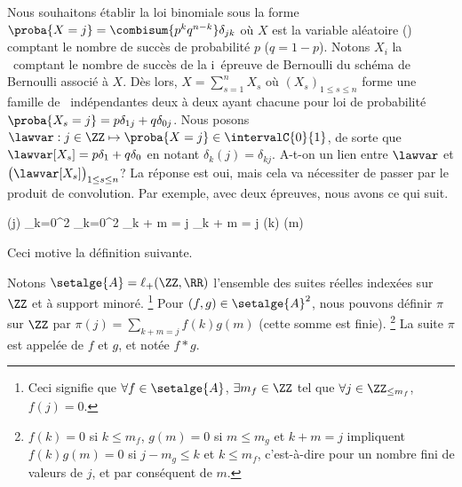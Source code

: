 Nous souhaitons établir la loi binomiale sous la forme
$\proba{X = j} = \combisum{p^k q^{n-k}} \delta_{jk}$
où $X$ est la variable aléatoire (\va) comptant le nombre de succès de probabilité $p$ ($q = 1 - p$).
%
Notons $X_i$ la \va\ comptant le nombre de succès de la i\ieme\ épreuve de Bernoulli du schéma de Bernoulli associé à $X$.
Dès lors,
$X = \sum_{s=1}^{n} X_s$ 
où
$(X_s)_{1 \leq s \leq n}$ forme une famille de \va\ indépendantes deux à deux  ayant chacune pour loi de probabilité $\proba{X_s = j} = p \delta_{1j} + q \delta_{0j}$.
Nous posons
$\lawvar: j \in \ZZ \mapsto \proba{X = j} \in \intervalC{0}{1}$,
de sorte que
$\lawvar[X_s] = p \delta_{1} + q \delta_{0}$
en notant
$\delta_{k}(j) = \delta_{kj}$.
A-t-on un lien entre $\lawvar$ et $\big( \lawvar[X_s] \big)_{1 \leq s \leq n}$? La réponse est oui, mais cela va nécessiter de passer par le produit de convolution.
%
Par exemple, avec deux épreuves, nous avons ce qui suit.


\begin{stepcalc}[style=sar]
	\lawvar(j)
\explnext{}
\explnext{}
	\dsum_{k=0}^{2} 
	\dsum_{k=0}^{2}  
	\dsum_{k + m = j}  
\explnext{}
	\dsum_{k + m = j} \lawvar[X_1](k) \lawvar[X_2](m)
\end{stepcalc}

Ceci motive la définition suivante.




\begin{defi}
	Notons $\setalge{A} = \ell_{+}(\ZZ , \RR)$ l'ensemble des suites réelles indexées sur $\ZZ$ et à support minoré.%
	\footnote{
		Ceci signifie que 
		$\forall f \in \setalge{A}$, 
		$\exists m_f \in \ZZ$ 
		tel que
		$\forall j \in \ZZ_{\leq m_f}$, $f(j) = 0$.
	}
	Pour $(f,g) \in \setalge{A}^2$,
	nous pouvons définir $\pi$ sur $\ZZ$ par
	$\pi(j) = \sum_{k + m = j} f(k) g(m)$
	(cette somme est finie).%
	\footnote{
		$f(k) = 0$ si $k \leq m_f$,
		$g(m) = 0$ si $m \leq m_g$
		et
		$k + m = j$
		impliquent
		$f(k) g(m) = 0$
		si
		$j - m_g \leq k$ et $k \leq m_f$,
		c'est-à-dire pour un nombre fini de valeurs de $j$, et par conséquent de $m$.
		
	}
	La suite $\pi$ est appelée  de $f$ et $g$,
	et notée $f \ast g$.
\end{defi}



